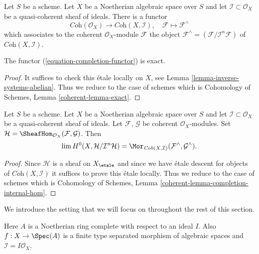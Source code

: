 \noindent
Let $S$ be a scheme. Let $X$ be a Noetherian algebraic space over $S$ and
let $\mathcal{I} \subset \mathcal{O}_X$ be a quasi-coherent sheaf of ideals.
There is a functor
\begin{equation}
\label{equation-completion-functor}
\textit{Coh}(\mathcal{O}_X) \longrightarrow \textit{Coh}(X, \mathcal{I}), \quad
\mathcal{F} \longmapsto \mathcal{F}^\wedge
\end{equation}
which associates to the coherent $\mathcal{O}_X$-module $\mathcal{F}$
the object $\mathcal{F}^\wedge = (\mathcal{F}/\mathcal{I}^n\mathcal{F})$
of $\textit{Coh}(X, \mathcal{I})$.

\begin{lemma}
\label{lemma-exact}
The functor (\ref{equation-completion-functor}) is exact.
\end{lemma}

\begin{proof}
It suffices to check this \'etale locally on $X$, see
Lemma \ref{lemma-inverse-systems-abelian}.
Thus we reduce to the case of schemes which is
Cohomology of Schemes, Lemma \ref{coherent-lemma-exact}.
\end{proof}

\begin{lemma}
\label{lemma-completion-internal-hom}
Let $S$ be a scheme. Let $X$ be a Noetherian algebraic space over $S$ and
let $\mathcal{I} \subset \mathcal{O}_X$ be a quasi-coherent sheaf of ideals.
Let $\mathcal{F}$, $\mathcal{G}$ be coherent $\mathcal{O}_X$-modules. Set
$\mathcal{H} = \SheafHom_{\mathcal{O}_X}(\mathcal{F}, \mathcal{G})$.
Then
$$
\lim H^0(X, \mathcal{H}/\mathcal{I}^n\mathcal{H}) =
\Mor_{\textit{Coh}(X, \mathcal{I})}
(\mathcal{F}^\wedge, \mathcal{G}^\wedge).
$$
\end{lemma}

\begin{proof}
Since $\mathcal{H}$ is a sheaf on $X_\etale$ and since
we have \'etale descent for objects of $\textit{Coh}(X, \mathcal{I})$
it suffices to prove this \'etale locally.
Thus we reduce to the case of schemes which is
Cohomology of Schemes, Lemma \ref{coherent-lemma-completion-internal-hom}.
\end{proof}

\noindent
We introduce the setting that we will focus on throughout the
rest of this section.

\begin{situation}
\label{situation-existence}
Here $A$ is a Noetherian ring complete with respect to an ideal $I$.
Also $f : X \to \Spec(A)$ is a finite type separated morphism of
algebraic spaces and $\mathcal{I} = I\mathcal{O}_X$.
\end{situation}

